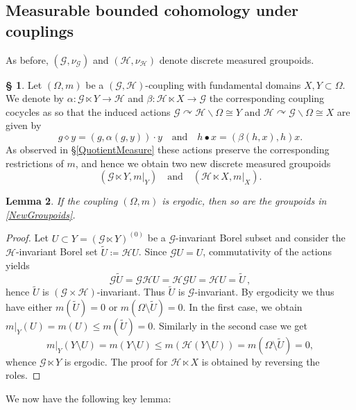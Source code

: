 \documentclass[11pt, oneside]{amsart}
\newtheorem{lemma}{Lemma}[section]
\theoremstyle{definition}
\newtheorem{no}[lemma]{\S}
\theoremstyle{remark}
\theoremstyle{TheoremNum}
\newcommand{\cG}{\mathcal{G}}
\newcommand{\cH}{\mathcal{H}}
\newcommand{\qand}{\quad \text{and} \quad}
\begin{document}
\subsection{Measurable bounded cohomology under couplings}\label{sec:4.2}
As before, $(\cG, \nu_{\cG})$ and $(\cH, \nu_{\cH})$ denote discrete measured groupoids.
\begin{no}\label{OEcocycle}
Let $(\Omega, m)$ be a $(\mathcal{G},\mathcal{H})$-coupling with fundamental domains $X, Y \subset \Omega$. We denote by $\alpha: \mathcal{G}\ltimes Y \to \mathcal{H}$ and $\beta: \cH \ltimes X \to \cG$ the corresponding coupling cocycles as  so that the induced actions  $\cG \curvearrowright \cH\backslash \Omega \cong Y$ and $\cH \curvearrowright \cG \backslash \Omega \cong X$ are given by
  \begin{equation}\label{eq:action:ME}
     g \diamond  y= (g, \alpha(g,y)) \cdot y \qand  h \bullet  x= (\beta(h,x), h)  x.
  \end{equation}
  As observed in \S \ref{QuotientMeasure} these actions preserve the corresponding restrictions of $m$, and hence we obtain two new discrete measured groupoids
\begin{equation}\label{NewGroupoids}
(\cG \ltimes Y,  m|_Y) \qand (\cH \ltimes X,  m|_X).
\end{equation}
\end{no}
\begin{lemma} If the coupling $(\Omega, m)$ is ergodic, then so are the groupoids in \eqref{NewGroupoids}.
\end{lemma}
\begin{proof} 
Let $U\subset Y = (\cG \ltimes Y)^{(0)}$ be a $\mathcal{G}$-invariant Borel subset and consider the $\mathcal{H}$-invariant Borel set $\widetilde{U}\coloneqq \mathcal{H}U$. Since
$\mathcal{G}U=U$, commutativity of the actions yields
$$\mathcal{G} \widetilde{U}= \mathcal{G}\mathcal{H}U=\mathcal{H} \mathcal{G}U=\mathcal{H}U=\widetilde{U}\,,$$
hence $\widetilde{U}$ is $(\cG \times \cH)$-invariant.
Thus $\widetilde{U}$ is $\mathcal{G}$-invariant. By ergodicity we thus have either $m(\widetilde{U})=0$ or $m(\Omega\setminus\widetilde{U})=0$. In the first case, we obtain 
$m|_{Y}(U)=m(U)\leq m(\widetilde{U})=0$. Similarly in the second case we get
\[m|_{Y}(Y\setminus U)=m(Y\setminus U)\leq m(\mathcal{H}(Y\setminus U))=m(\Omega\setminus\widetilde{U})=0,\] whence $\mathcal{G}\ltimes Y$ is ergodic. 
The proof for $\mathcal{H}\ltimes X$ is obtained by reversing the roles.\end{proof}
We now have the following key lemma:
\end{document}
